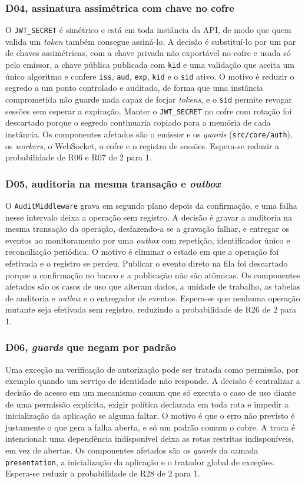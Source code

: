 \documentclass[conference]{IEEEtran}
\begin{document}
\subsubsection{D04, assinatura assimétrica com chave no cofre}
O \texttt{JWT\_SECRET} é simétrico e está em toda instância da API, de modo que quem valida um \textit{token} também consegue assiná-lo. A decisão é substituí-lo por um par de chaves assimétricas, com a chave privada não exportável no cofre e usada só pelo emissor, a chave pública publicada com \texttt{kid} e uma validação que aceita um único algoritmo e confere \texttt{iss}, \texttt{aud}, \texttt{exp}, \texttt{kid} e o \texttt{sid} ativo. O motivo é reduzir o segredo a um ponto controlado e auditado, de forma que uma instância comprometida não guarde nada capaz de forjar \textit{tokens}, e o \texttt{sid} permite revogar sessões sem esperar a expiração. Manter o \texttt{JWT\_SECRET} no cofre com rotação foi descartado porque o segredo continuaria copiado para a memória de cada instância. Os componentes afetados são o emissor e os \textit{guards} (\texttt{src/core/auth}), os \textit{workers}, o WebSocket, o cofre e o registro de sessões. Espera-se reduzir a probabilidade de R06 e R07 de 2 para 1.

\subsubsection{D05, auditoria na mesma transação e \textit{outbox}}
O \texttt{AuditMiddleware} grava em segundo plano depois da confirmação, e uma falha nesse intervalo deixa a operação sem registro. A decisão é gravar a auditoria na mesma transação da operação, desfazendo-a se a gravação falhar, e entregar os eventos ao monitoramento por uma \textit{outbox} com repetição, identificador único e reconciliação periódica. O motivo é eliminar o estado em que a operação foi efetivada e o registro se perdeu. Publicar o evento direto na fila foi descartado porque a confirmação no banco e a publicação não são atômicas. Os componentes afetados são os casos de uso que alteram dados, a unidade de trabalho, as tabelas de auditoria e \textit{outbox} e o entregador de eventos. Espera-se que nenhuma operação mutante seja efetivada sem registro, reduzindo a probabilidade de R26 de 2 para 1.

\subsubsection{D06, \textit{guards} que negam por padrão}
Uma exceção na verificação de autorização pode ser tratada como permissão, por exemplo quando um serviço de identidade não responde. A decisão é centralizar a decisão de acesso em um mecanismo comum que só executa o caso de uso diante de uma permissão explícita, exigir política declarada em toda rota e impedir a inicialização da aplicação se alguma faltar. O motivo é que o erro não previsto é justamente o que gera a falha aberta, e só um padrão comum o cobre. A troca é intencional: uma dependência indisponível deixa as rotas restritas indisponíveis, em vez de abertas. Os componentes afetados são os \textit{guards} da camada \texttt{presentation}, a inicialização da aplicação e o tratador global de exceções. Espera-se reduzir a probabilidade de R28 de 2 para 1.
\end{document}
